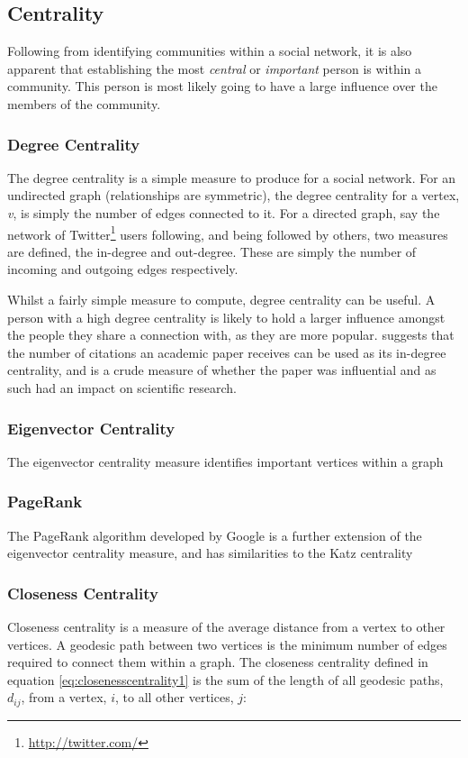 \subsection{Centrality}
Following from identifying communities within a social network, it is also apparent that establishing the most \emph{central} or \emph{important} person is within a community. This person is most likely going to have a large influence over the members of the community.

\subsubsection{Degree Centrality}
The degree centrality is a simple measure to produce for a social network. For an undirected graph (relationships are symmetric), the degree centrality for a vertex, \emph{v}, is simply the number of edges connected to it. For a directed graph, say the network of Twitter\footnote{\url{http://twitter.com/}} users following, and being followed by others, two measures are defined, the in-degree and out-degree. These are simply the number of incoming and outgoing edges respectively.

Whilst a fairly simple measure to compute, degree centrality can be useful. A person with a high degree centrality is likely to hold a larger influence amongst the people they share a connection with, as they are more popular. \cite[p.~169]{newman10} suggests that the number of citations an academic paper receives can be used as its in-degree centrality, and is a crude measure of whether the paper was influential and as such had an impact on scientific research.

\subsubsection{Eigenvector Centrality}
The eigenvector centrality measure identifies important vertices within a graph

\subsubsection{PageRank}
The PageRank algorithm \cite{pagerank} developed by Google is a further extension of the eigenvector centrality measure, and has similarities to the Katz centrality 

\subsubsection{Closeness Centrality}
Closeness centrality is a measure of the average distance from a vertex to other vertices. A geodesic path between two vertices is the minimum number of edges required to connect them within a graph. The closeness centrality defined in equation \ref{eq:closenesscentrality1} is the sum of the length of all geodesic paths, $d_{ij}$, from a vertex, $i$, to all other vertices, $j$:


